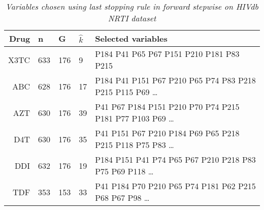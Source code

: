 \begin{table}[ht]
\centering
\begin{tabular}{rllll}
  \hline
Drug & n & G & $\hat k$ & Selected variables \\ 
  \hline
X3TC & 633 & 176 & 9 & P184 P41 P65 P67 P151 P210 P181 P83 P215 \\ 
ABC & 628 & 176 & 17 & P184 P41 P151 P67 P210 P65 P74 P83 P218 P215 P115 P69
\ldots  \\%
AZT & 630 & 176 & 39 & P41 P67 P184 P151 P210 P70 P74 P215 P181 P77
P103 P69 \ldots \\ %
D4T & 630 & 176 & 35 &P41 P151 P67 P210 P184 P69 P65 P218 P215 P118 P75 P83
\ldots \\ %
DDI & 632 & 176 & 19 & P184 P151 P41 P74 P65 P67 P210 P218 P83 P75 P69
P118
\ldots \\ %
TDF & 353 & 153 & 33 &P41 P184 P70 P210 P65 P74 P181 P62 P215 P68 P67 P98
\ldots \\ %
   \hline
\end{tabular}
\caption{\em Variables chosen using \textit{last} stopping rule in forward
  stepwise on HIVdb NRTI dataset} 
\label{tab:hivNRTI}
\end{table}


